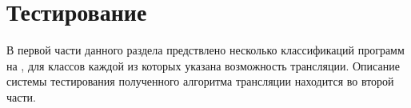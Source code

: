 \section{Тестирование}
\label{test}

В первой части данного раздела предствлено несколько классификаций программ на \miniKanren{}, для классов каждой из которых указана возможность трансляции.
Описание системы тестирования полученного алгоритма трансляции находится во второй части.



